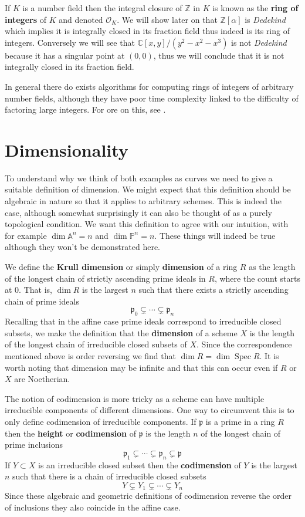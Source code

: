 \documentclass{article}
\DeclareMathOperator{\Spec}{Spec}
\newcommand{\p}{\ensuremath{\mathfrak{p}}}
\newcommand{\A}{\ensuremath{\mathbb{A}}}
\newcommand{\Z}{\ensuremath{\mathbb{Z}}}
\newcommand{\C}{\ensuremath{\mathbb{C}}}
\newcommand{\Q}{\ensuremath{\mathbb{Q}}}
\renewcommand{\P}{\ensuremath{\mathbb{P}}}
\theoremstyle{definition}
\begin{document}
If $K$ is a number field then the integral closure of $\Z$ in $K$ is known as the \textbf{ring of integers} of $K$ and denoted $\mathcal{O}_K$.
We will show later on that $\Z\left[\alpha\right]$ is \textit{Dedekind} which implies it is integrally closed in its fraction field thus indeed is its ring of integers.
Conversely we will see that $\C[x,y]/(y^2-x^2-x^3)$ is not \textit{Dedekind} because it has a singular point at $(0,0)$, thus we will conclude that it is not integrally closed in its fraction field.

In general there do exists algorithms for computing rings of integers of arbitrary number fields, although they have poor time complexity linked to the difficulty of factoring large integers.
For ore on this, see \citeauthor{stevenhagen2012number}.


\section{Dimensionality}
\label{dimSec}
To understand why we think of both examples as curves we need to give a suitable definition of dimension.
We might expect that this definition should be algebraic in nature so that it applies to arbitrary schemes.
This is indeed the case, although somewhat surprisingly it can also be thought of as a purely topological condition.
We want this definition to agree with our intuition, with for example $\dim \A^n =n$ and $\dim \P^n=n$.
These things will indeed be true although they won't be demonstrated here.

We define the \textbf{Krull dimension} or simply \textbf{dimension} of a ring $R$ as the length of the longest chain of strictly ascending prime ideals in $R$, where the count starts at 0.
That is, $\dim R$ is the largest $n$ such that there exists a strictly ascending chain of prime ideals
$$\p_0 \subsetneq \cdots \subsetneq \p_n$$
Recalling that in the affine case prime ideals correspond to irreducible closed subsets, we make the definition that the \textbf{dimension} of a scheme $X$ is the length of the longest chain of irreducible closed subsets of $X$.
Since the correspondence mentioned above is order reversing we find that $\dim R = \dim \Spec R$.
It is worth noting that dimension may be infinite and that this can occur even if $R$ or $X$ are Noetherian.

The notion of codimension is more tricky as a scheme can have multiple irreducible components of different dimensions.
One way to circumvent this is to only define codimension of irreducible components.
If $\p$ is a prime in a ring $R$ then the \textbf{height} or \textbf{codimension} of $\p$ is the length $n$ of the longest chain of prime inclusions
$$\p_1 \subsetneq \cdots \subsetneq \p_n \subsetneq \p$$
If $Y \subset X$ is an irreducible closed subset then the \textbf{codimension} of $Y$ is the largest $n$ such that there is a chain of irreducible closed subsets
$$Y \subsetneq Y_1 \subsetneq \cdots \subsetneq Y_n$$
Since these algebraic and geometric definitions of codimension reverse the order of inclusions they also coincide in the affine case.
\end{document}

